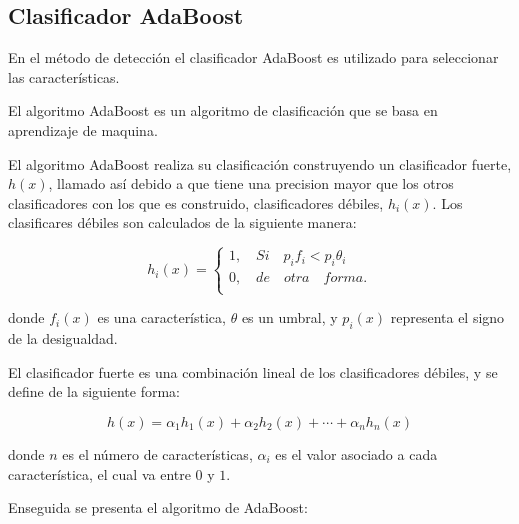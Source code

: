 \subsection{Clasificador AdaBoost}\label{subsec:AdaboostClasifier}  

En el método de detección el clasificador AdaBoost es utilizado para seleccionar las características. 

El algoritmo AdaBoost es un algoritmo de clasificación que se basa en aprendizaje de maquina.  

El algoritmo AdaBoost realiza su clasificación construyendo un clasificador fuerte, $h(x)$, llamado así debido a que tiene una precision mayor que los otros clasificadores con los que es construido, clasificadores débiles, $h_i(x)$. Los clasificares débiles son calculados de la siguiente manera: 

$$h_i(x)=
\begin{cases}   
1, \quad Si \quad  p_if_i<p_i \theta_i \\
0, \quad de \quad otra \quad forma.\\
\end{cases}$$

donde $f_i(x)$ es una característica, $\theta$ es un umbral, y $p_i(x)$ representa el signo de la desigualdad.   

El clasificador fuerte es una combinación lineal de los clasificadores débiles, y se define de la siguiente forma: 

$$h(x)= \alpha_1h_1(x)+\alpha_2h_2(x)+ \cdots +\alpha_nh_n(x)$$ 

donde $n$ es el n\'umero de características, $\alpha_i$ es el valor asociado a cada característica, el cual va entre $0$ y $1$.


Enseguida se presenta el algoritmo de AdaBoost:

